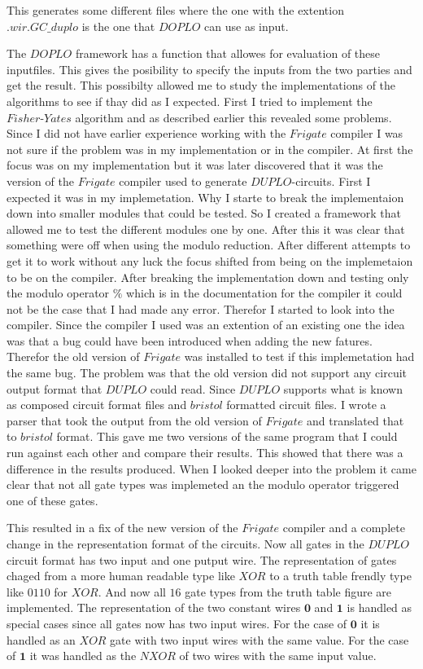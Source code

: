\documentclass[twoside,11pt,openright]{report}
\begin{document}
This generates some different files where the one with the extention $.wir.GC\_duplo$ is the one that $DOPLO$ can use as input.

\bigskip

The $DOPLO$ framework has a function that allowes for evaluation of these inputfiles. This gives the posibility to specify the inputs from the two parties and get the result. This possibilty allowed me to study the implementations of the algorithms to see if thay did as I expected. First I tried to implement the $Fisher\text{-}Yates$ algorithm and as described earlier this revealed some problems. Since I did not have earlier experience working with the $Frigate$ compiler I was not sure if the problem was in my implementation or in the compiler. At first the focus was on my implementation but it was later discovered that it was the version of the $Frigate$ compiler used to generate $DUPLO$-circuits. First I expected it was in my implemetation. Why I starte to break the implementaion down into smaller modules that could be tested. So I created a framework that allowed me to test the different modules one by one. After this it was clear that something were off when using the modulo reduction. After different attempts to get it to work without any luck the focus shifted from being on the implemetaion to be on the compiler. After breaking the implementation down and testing only the modulo operator $\%$ which is in the documentation for the compiler it could not be the case that I had made any error. Therefor I started to look into the compiler. Since the compiler I used was an extention of an existing one the idea was that a bug could have been introduced when adding the new fatures. Therefor the old version of $Frigate$ was installed to test if this implemetation had the same bug. The problem was that the old version did not support any circuit output format that $DUPLO$ could read. Since $DUPLO$ supports what is known as composed circuit format files and $bristol$ formatted circuit files. I wrote a parser that took the output from the old version of $Frigate$ and translated that to $bristol$ format. This gave me two versions of the same program that I could run against each other and compare their results. This showed that there was a difference in the results produced. When I looked deeper into the problem it came clear that not all gate types was implemeted an the modulo operator triggered one of these gates.

This resulted in a fix of the new version of the $Frigate$ compiler and a complete change in the representation format of the circuits. Now all gates in the $DUPLO$ circuit format has two input and one putput wire. The representation of gates chaged from a more human readable type like $XOR$ to a truth table frendly type like $0110$ for $XOR$. And now all $16$ gate types from the truth table figure are implemented. The representation of the two constant wires $\textbf{0}$ and $\textbf{1}$ is handled as special cases since all gates now has two input wires. For the case of $\textbf{0}$ it is handled as an $XOR$ gate with two input wires with the same value. For the case of $\textbf{1}$ it was handled as the $NXOR$ of two wires with the same input value.
\end{document}

